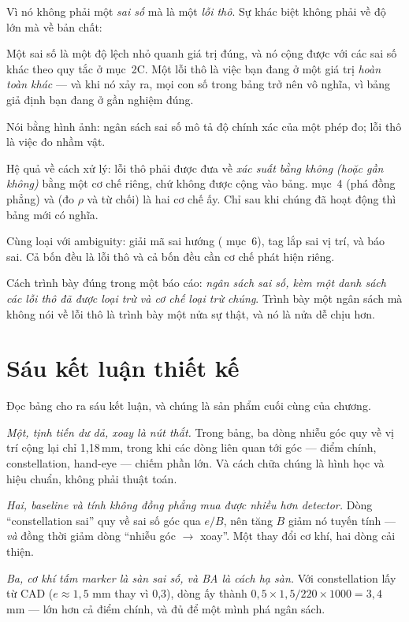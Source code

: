 \documentclass[../../marker.tex]{subfiles}
\begin{document}
Vì nó không phải một \emph{sai số} mà là một \emph{lỗi thô}. Sự khác biệt không phải về độ lớn mà về bản chất:

Một sai số là một độ lệch nhỏ quanh giá trị đúng, và nó cộng được với các sai số khác theo quy tắc ở mục~2C. Một lỗi thô là việc bạn đang ở một giá trị \emph{hoàn toàn khác} --- và khi nó xảy ra, mọi con số trong bảng trở nên vô nghĩa, vì bảng giả định bạn đang ở gần nghiệm đúng.

Nói bằng hình ảnh: ngân sách sai số mô tả độ chính xác của một phép đo; lỗi thô là việc đo nhầm vật.

Hệ quả về cách xử lý: lỗi thô phải được đưa về \emph{xác suất bằng không (hoặc gần không)} bằng một cơ chế riêng, chứ không được cộng vào bảng.  mục~4 (phá đồng phẳng) và  (đo \(\rho\) và từ chối) là hai cơ chế ấy. Chỉ sau khi chúng đã hoạt động thì bảng mới có nghĩa.

Cùng loại với ambiguity: giải mã sai hướng ( mục~6), tag lắp sai vị trí, và báo sai. Cả bốn đều là lỗi thô và cả bốn đều cần cơ chế phát hiện riêng.

Cách trình bày đúng trong một báo cáo: \emph{ngân sách sai số, kèm một danh sách các lỗi thô đã được loại trừ và cơ chế loại trừ chúng}. Trình bày một ngân sách mà không nói về lỗi thô là trình bày một nửa sự thật, và nó là nửa dễ chịu hơn.

\section{Sáu kết luận thiết kế}

Đọc bảng cho ra sáu kết luận, và chúng là sản phẩm cuối cùng của chương.

\emph{Một, tịnh tiến dư dả, xoay là nút thắt.} Trong bảng, ba dòng nhiễu góc quy về vị trí cộng lại chỉ 1,18\,mm, trong khi các dòng liên quan tới góc --- điểm chính, constellation, hand-eye --- chiếm phần lớn. Và cách chữa chúng là hình học và hiệu chuẩn, không phải thuật toán.

\emph{Hai, baseline và tính không đồng phẳng mua được nhiều hơn detector.} Dòng ``constellation sai'' quy về sai số góc qua \(e/B\), nên tăng \(B\) giảm nó tuyến tính --- \emph{và} đồng thời giảm dòng ``nhiễu góc \(\rightarrow\) xoay''. Một thay đổi cơ khí, hai dòng cải thiện.

\emph{Ba, cơ khí tấm marker là sàn sai số, và BA là cách hạ sàn.} Với constellation lấy từ CAD (\(e \approx 1{,}5\) mm thay vì 0,3), dòng ấy thành \(0{,}5 \times 1{,}5/220 \times 1000 = 3{,}4\) mm --- lớn hơn cả điểm chính, và đủ để một mình phá ngân sách.
\end{document}
